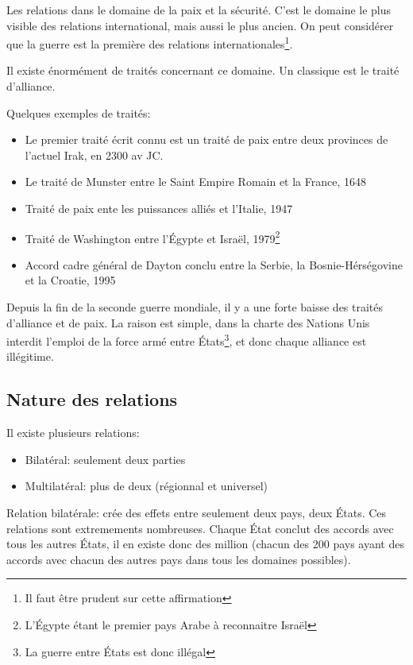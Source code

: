 ﻿\documentclass[12pt, a4paper, openany]{book}
\begin{document}
Les relations dans le domaine de la paix et la sécurité. C'est le domaine le plus visible des relations international, mais aussi le plus ancien. On peut considérer que la guerre est la première des relations internationales\footnote{Il faut être prudent sur cette affirmation}.

Il existe énormément de traités concernant ce domaine. Un classique est le traité d'alliance.

Quelques exemples de traités:
\begin{itemize}
\item Le premier traité écrit connu est un traité de paix entre deux provinces de l'actuel Irak, en 2300 av JC.
\item Le traité de Munster entre le Saint Empire Romain et la France, 1648
\item Traité de paix ente les puissances alliés et l'Italie, 1947
\item Traité de Washington entre l'Égypte et Israël, 1979\footnote{L'Égypte étant le premier pays Arabe à reconnaitre Israël}
\item Accord cadre général de Dayton conclu entre la Serbie, la Bosnie-Hérségovine et la Croatie, 1995
\end{itemize}

Depuis la fin de la seconde guerre mondiale, il y a une forte baisse des traités d'alliance et de paix. La raison est simple, dans la charte des Nations Unis interdit l'emploi de la force armé entre États\footnote{La guerre entre États est donc illégal}, et donc chaque alliance est illégitime.

		\subsection{Nature des relations}
		
Il existe plusieurs relations:
\begin{itemize}
\item Bilatéral: seulement deux parties
\item Multilatéral: plus de deux (régionnal et universel)
\end{itemize}

Relation bilatérale: crée des effets entre seulement deux pays, deux États. Ces relations sont extremements nombreuses. Chaque État conclut des accords avec tous les autres États, il en existe donc des million (chacun des 200 pays ayant des accords avec chacun des autres pays dans tous les domaines possibles).
\end{document}
